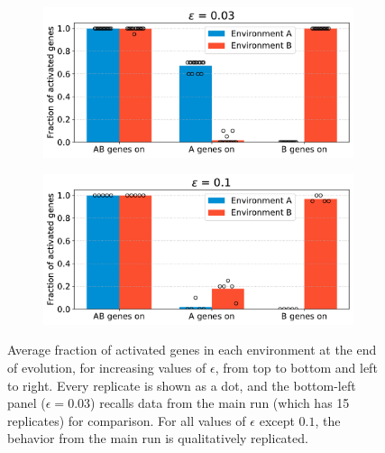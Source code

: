 \begin{figure}[H]
  \begin{subfigure}[t]{0.49\textwidth}
    \includegraphics[width=\textwidth]{alife/img/mean_activation_epsilon.pdf}
    \label{subfig:alife:param_epsilon_3}
  \end{subfigure}
  \begin{subfigure}[t]{0.49\textwidth}
    \includegraphics[width=\textwidth]{alife/img/mean_activation_epsilon-0.1.pdf}
    \label{subfig:alife:param_epsilon_4}
  \end{subfigure}
  \caption[Parameter exploration in the simple model: varying $\epsilon$]{Average fraction of activated genes in each environment at the end of evolution, for increasing values of $\epsilon$, from top to bottom and left to right.
  Every replicate is shown as a dot, and the bottom-left panel ($\epsilon = 0.03$) recalls data from the main run (which has 15 replicates) for comparison.
  For all values of $\epsilon$ except $0.1$, the behavior from the main run is qualitatively replicated.}
  \label{fig:alife:param_epsilon}
\end{figure}


